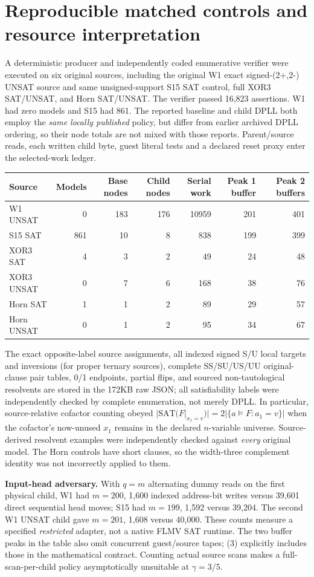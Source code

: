 \documentclass[11pt]{article}
\begin{document}
\section{Reproducible matched controls and resource interpretation}
A deterministic producer and independently coded enumerative verifier were executed on six original sources, including the original W1 exact signed-(2+,2-) UNSAT source and same unsigned-support S15 SAT control, full XOR3 SAT/UNSAT, and Horn SAT/UNSAT. The verifier passed 16,823 assertions. W1 had zero models and S15 had 861. The reported baseline and child DPLL both employ the \emph{same locally published} policy, but differ from earlier archived DPLL ordering, so their node totals are not mixed with those reports. Parent/source reads, each written child byte, guest literal tests and a declared reset proxy enter the selected-work ledger.
\begin{center}\begin{tabular}{lrrrrrr}
\toprule
Source&Models& Base nodes&Child nodes&Serial work&Peak 1 buffer&Peak 2 buffers\\\midrule
W1 UNSAT&0&183&176&10959&201&401\\
S15 SAT&861&10&8&838&199&399\\
XOR3 SAT&4&3&2&49&24&48\\
XOR3 UNSAT&0&7&6&168&38&76\\
Horn SAT&1&1&2&89&29&57\\
Horn UNSAT&0&1&2&95&34&67\\\bottomrule
\end{tabular}\end{center}
The exact opposite-label source assignments, all indexed signed S/U local targets and inversions (for proper ternary sources), complete SS/SU/US/UU original-clause pair tables, 0/1 endpoints, partial flips, and sourced non-tautological resolvents are stored in the 172KB raw JSON; all satisfiability labels were independently checked by complete enumeration, not merely DPLL. In particular, source-relative cofactor counting obeyed $|\mathrm{SAT}(F|_{x_1=v})|=2|\{a\models F:a_1=v\}|$ when the cofactor's now-unused $x_1$ remains in the declared $n$-variable universe. Source-derived resolvent examples were independently checked against \emph{every} original model. The Horn controls have short clauses, so the width-three complement identity was not incorrectly applied to them.

\noindent\textbf{Input-head adversary.} With $q=m$ alternating dummy reads on the first physical child, W1 had $m=200$, 1,600 indexed address-bit writes versus 39,601 direct sequential head moves; S15 had $m=199$, 1,592 versus 39,204. The second W1 UNSAT child gave $m=201$, 1,608 versus 40,000. These counts measure a specified \emph{restricted} adapter, not a native FLMV SAT runtime. The two buffer peaks in the table also omit concurrent guest/source tapes; (3) explicitly includes those in the mathematical contract. Counting actual source scans makes a full-scan-per-child policy asymptotically unsuitable at $\gamma=3/5$.
\end{document}
